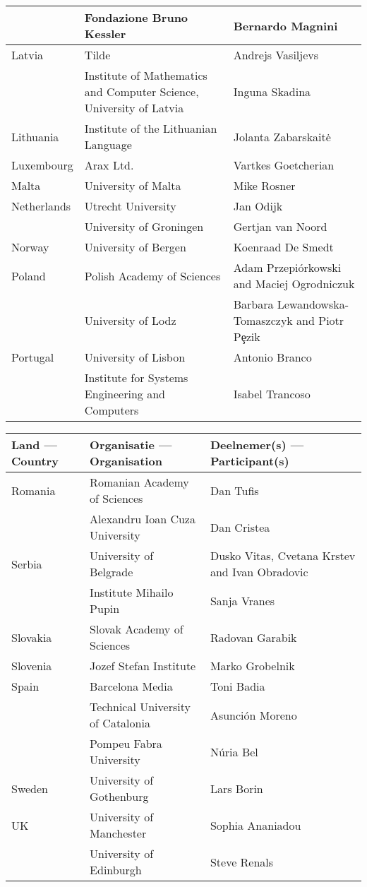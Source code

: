 \documentclass{scrartcl}
\begin{document}
\begin{Parallel}[c]{70mm}{70mm}
\begin{tabular*}{\textwidth}{l|p{6cm}|p{4cm}}
    \hline & Fondazione Bruno Kessler & Bernardo Magnini\\
    \hline Latvia & Tilde & Andrejs Vasiljevs\\
    \hline & Institute of Mathematics and Computer Science, University of Latvia & Inguna Skadina\\
    \hline Lithuania & Institute of the Lithuanian Language & Jolanta Zabarskait{\.e}\\
    \hline Luxembourg & Arax Ltd. & Vartkes Goetcherian\\
    \hline Malta & University of Malta & Mike Rosner\\
    \hline Netherlands & Utrecht University & Jan Odijk\\
    \hline & University of Groningen & Gertjan van Noord\\
    \hline Norway & University of Bergen & Koenraad De Smedt\\
    \hline Poland & Polish Academy of Sciences & Adam Przepi{\'o}rkowski and
    Maciej Ogrodniczuk \\
    \hline & University of Lodz & Barbara Lewandowska-Tomaszczyk and Piotr P{\c{e}}zik\\
    \hline Portugal & University of Lisbon & Antonio Branco\\
    \hline & Institute for Systems Engineering and Computers & Isabel Trancoso\\
\end{tabular*}

  \begin{tabular*}{\textwidth}{l|p{6cm}|p{4cm}}
    \hline \textbf{Land --- Country} & \textbf{Organisatie --- Organisation} & \textbf{Deelnemer(s) --- Participant(s)} \\
    \hline Romania &	Romanian Academy of Sciences &	Dan Tufis\\
 	\hline         & Alexandru Ioan Cuza University	 & Dan Cristea\\
    \hline Serbia &	University of Belgrade	& Dusko Vitas, Cvetana Krstev and
Ivan Obradovic\\
    \hline &	Institute Mihailo Pupin &	Sanja Vranes\\
    \hline Slovakia  & 	Slovak Academy of Sciences	& Radovan Garabik\\
    \hline Slovenia  & 	Jozef Stefan Institute	& Marko Grobelnik\\
    \hline Spain  & 	Barcelona Media	& Toni Badia\\
 	\hline        & Technical University of Catalonia	& Asunci{\'o}n Moreno\\
 	\hline        & Pompeu Fabra University	& N{\'u}ria Bel\\
    \hline Sweden &	University of Gothenburg & 	Lars Borin\\
    \hline UK 	& University of Manchester 	& Sophia Ananiadou\\
    \hline      &	University of Edinburgh	& Steve Renals
  \end{tabular*}

  \end{Parallel}

  
  
\end{document}
